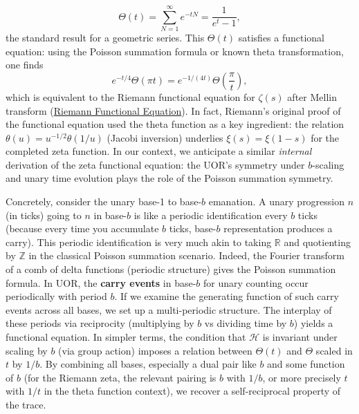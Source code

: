 \documentclass{article}
\begin{document}
$$
\Theta(t) = \sum_{N=1}^\infty e^{-tN} = \frac{1}{e^t - 1},
$$
the standard result for a geometric series. This $\Theta(t)$ satisfies a functional equation: using the Poisson summation formula or known theta transformation, one finds 
$$
e^{-t/4}\Theta(\pi t) = e^{-1/(4t)}\Theta\!\left(\frac{\pi}{t}\right),
$$
which is equivalent to the Riemann functional equation for $\zeta(s)$ after Mellin transform (\href{https://empslocal.ex.ac.uk/people/staff/mrwatkin/zeta/fnleqn.htm#:~:text=Theorem%3A%20Let%20%5BImage%200%3A%20%24%5CLambda%28s%29%3D%5Cpi%5E%7B,s}{Riemann Functional Equation}). In fact, Riemann’s original proof of the functional equation used the theta function as a key ingredient: the relation $\theta(u) = u^{-1/2}\theta(1/u)$ (Jacobi inversion) underlies $\xi(s) = \xi(1-s)$ for the completed zeta function. In our context, we anticipate a similar \emph{internal} derivation of the zeta functional equation: the UOR’s symmetry under $b$-scaling and unary time evolution plays the role of the Poisson summation symmetry.

\medskip

Concretely, consider the unary base-1 to base-$b$ emanation. A unary progression $n$ (in ticks) going to $n$ in base-$b$ is like a periodic identification every $b$ ticks (because every time you accumulate $b$ ticks, base-$b$ representation produces a carry). This periodic identification is very much akin to taking $\mathbb{R}$ and quotienting by $\mathbb{Z}$ in the classical Poisson summation scenario. Indeed, the Fourier transform of a comb of delta functions (periodic structure) gives the Poisson summation formula. In UOR, the \textbf{carry events} in base-$b$ for unary counting occur periodically with period $b$. If we examine the generating function of such carry events across all bases, we set up a multi-periodic structure. The interplay of these periods via reciprocity (multiplying by $b$ vs dividing time by $b$) yields a functional equation. In simpler terms, the condition that $\mathcal{H}$ is invariant under scaling by $b$ (via group action) imposes a relation between $\Theta(t)$ and $\Theta$ scaled in $t$ by $1/b$. By combining all bases, especially a dual pair like $b$ and some function of $b$ (for the Riemann zeta, the relevant pairing is $b$ with $1/b$, or more precisely $t$ with $1/t$ in the theta function context), we recover a self-reciprocal property of the trace.

\medskip
\end{document}
